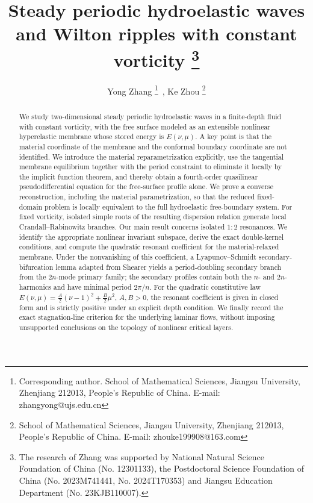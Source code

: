 \documentclass[12pt]{article}
\numberwithin{equation}{section}
\numberwithin{equation}{section}
\begin{document}
\title{Steady periodic hydroelastic waves and Wilton ripples with constant vorticity
\thanks{ The research of Zhang was supported by National Natural Science Foundation of China (No. 12301133), the Postdoctoral Science Foundation of China (No. 2023M741441, No. 2024T170353) and Jiangsu Education Department (No. 23KJB110007).}}
\author{Yong Zhang
\thanks{Corresponding author. School of Mathematical Sciences, Jiangsu University, Zhenjiang 212013, People's Republic of China. E-mail: zhangyong@ujs.edu.cn} \,,
Ke Zhou
\thanks{School of Mathematical Sciences, Jiangsu University, Zhenjiang 212013, People's Republic of China. E-mail: zhouke199908@163.com}
}
\date{}
\maketitle

\renewcommand{\abstractname}{Abstract}

\begin{abstract}
We study two-dimensional steady periodic hydroelastic waves in a finite-depth fluid with constant vorticity, with the free surface modeled as an extensible nonlinear hyperelastic membrane whose stored energy is $E(\nu,\mu)$. A key point is that the material coordinate of the membrane and the conformal boundary coordinate are not identified. We introduce the material reparametrization explicitly, use the tangential membrane equilibrium together with the period constraint to eliminate it locally by the implicit function theorem, and thereby obtain a fourth-order quasilinear pseudodifferential equation for the free-surface profile alone. We prove a converse reconstruction, including the material parametrization, so that the reduced fixed-domain problem is locally equivalent to the full hydroelastic free-boundary system. For fixed vorticity, isolated simple roots of the resulting dispersion relation generate local Crandall--Rabinowitz branches. Our main result concerns isolated $1{:}2$ resonances. We identify the appropriate nonlinear invariant subspace, derive the exact double-kernel conditions, and compute the quadratic resonant coefficient for the material-relaxed membrane. Under the nonvanishing of this coefficient, a Lyapunov--Schmidt secondary-bifurcation lemma adapted from Shearer yields a period-doubling secondary branch from the $2n$-mode primary family; the secondary profiles contain both the $n$- and $2n$-harmonics and have minimal period $2\pi/n$. For the quadratic constitutive law $E(\nu,\mu)=\frac A2(\nu-1)^2+\frac B2\mu^2$, $A,B>0$, the resonant coefficient is given in closed form and is strictly positive under an explicit depth condition. We finally record the exact stagnation-line criterion for the underlying laminar flows, without imposing unsupported conclusions on the topology of nonlinear critical layers.
\end{abstract}
\end{document}
